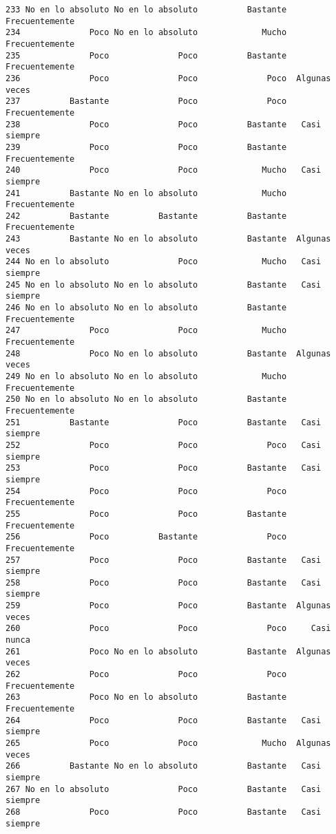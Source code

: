\documentclass[
  letterpaper,
  DIV=11,
  numbers=noendperiod]{scrartcl}
\begin{document}
\begin{verbatim}
233 No en lo absoluto No en lo absoluto          Bastante Frecuentemente
234              Poco No en lo absoluto             Mucho Frecuentemente
235              Poco              Poco          Bastante Frecuentemente
236              Poco              Poco              Poco  Algunas veces
237          Bastante              Poco              Poco Frecuentemente
238              Poco              Poco          Bastante   Casi siempre
239              Poco              Poco          Bastante Frecuentemente
240              Poco              Poco             Mucho   Casi siempre
241          Bastante No en lo absoluto             Mucho Frecuentemente
242          Bastante          Bastante          Bastante Frecuentemente
243          Bastante No en lo absoluto          Bastante  Algunas veces
244 No en lo absoluto              Poco             Mucho   Casi siempre
245 No en lo absoluto No en lo absoluto          Bastante   Casi siempre
246 No en lo absoluto No en lo absoluto          Bastante Frecuentemente
247              Poco              Poco             Mucho Frecuentemente
248              Poco No en lo absoluto          Bastante  Algunas veces
249 No en lo absoluto No en lo absoluto             Mucho Frecuentemente
250 No en lo absoluto No en lo absoluto          Bastante Frecuentemente
251          Bastante              Poco          Bastante   Casi siempre
252              Poco              Poco              Poco   Casi siempre
253              Poco              Poco          Bastante   Casi siempre
254              Poco              Poco              Poco Frecuentemente
255              Poco              Poco          Bastante Frecuentemente
256              Poco          Bastante              Poco Frecuentemente
257              Poco              Poco          Bastante   Casi siempre
258              Poco              Poco          Bastante   Casi siempre
259              Poco              Poco          Bastante  Algunas veces
260              Poco              Poco              Poco     Casi nunca
261              Poco No en lo absoluto          Bastante  Algunas veces
262              Poco              Poco              Poco Frecuentemente
263              Poco No en lo absoluto          Bastante Frecuentemente
264              Poco              Poco          Bastante   Casi siempre
265              Poco              Poco             Mucho  Algunas veces
266          Bastante No en lo absoluto          Bastante   Casi siempre
267 No en lo absoluto              Poco          Bastante   Casi siempre
268              Poco              Poco          Bastante   Casi siempre

\end{verbatim}
\end{document}
